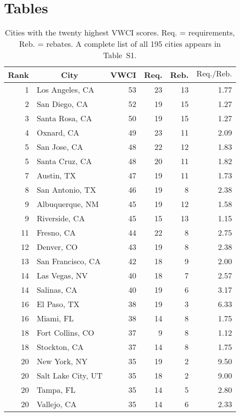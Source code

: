 \documentclass[draft,linenumbers]{agujournal}
\begin{document}
%
%
\clearpage
\section*{Tables}

\begin{table}[htbp]
\centering
\caption{Cities with the twenty highest VWCI scores. Req. = requirements, Reb. = rebates. A complete list of all 195 cities appears in Table~S1.} 
\label{tab:top_vwci}
\begin{tabular}{rlrrrr}
  \hline
\multicolumn{1}{c}{ Rank } & \multicolumn{1}{c}{ City } & \multicolumn{1}{c}{ VWCI } & \multicolumn{1}{c}{ Req. } & \multicolumn{1}{c}{ Reb. } & \multicolumn{1}{c}{ $\text{Req.}/\text{Reb.}$ } \\ 
  \hline
  1 & Los Angeles, CA &  53 &  23 &  13 & 1.77 \\ 
    2 & San Diego, CA &  52 &  19 &  15 & 1.27 \\ 
    3 & Santa Rosa, CA &  50 &  19 &  15 & 1.27 \\ 
    4 & Oxnard, CA &  49 &  23 &  11 & 2.09 \\ 
    5 & San Jose, CA &  48 &  22 &  12 & 1.83 \\ 
    5 & Santa Cruz, CA &  48 &  20 &  11 & 1.82 \\ 
    7 & Austin, TX &  47 &  19 &  11 & 1.73 \\ 
    8 & San Antonio, TX &  46 &  19 &   8 & 2.38 \\ 
    9 & Albuquerque, NM &  45 &  19 &  12 & 1.58 \\ 
    9 & Riverside, CA &  45 &  15 &  13 & 1.15 \\ 
   11 & Fresno, CA &  44 &  22 &   8 & 2.75 \\ 
   12 & Denver, CO &  43 &  19 &   8 & 2.38 \\ 
   13 & San Francisco, CA &  42 &  18 &   9 & 2.00 \\ 
   14 & Las Vegas, NV &  40 &  18 &   7 & 2.57 \\ 
   14 & Salinas, CA &  40 &  19 &   6 & 3.17 \\ 
   16 & El Paso, TX &  38 &  19 &   3 & 6.33 \\ 
   16 & Miami, FL &  38 &  14 &   8 & 1.75 \\ 
   18 & Fort Collins, CO &  37 &   9 &   8 & 1.12 \\ 
   18 & Stockton, CA &  37 &  14 &   8 & 1.75 \\ 
   20 & New York, NY &  35 &  19 &   2 & 9.50 \\ 
   20 & Salt Lake City, UT &  35 &  18 &   2 & 9.00 \\ 
   20 & Tampa, FL &  35 &  14 &   5 & 2.80 \\ 
   20 & Vallejo, CA &  35 &  14 &   6 & 2.33 \\ 
   \hline
\end{tabular}
\end{table}
\end{document}
